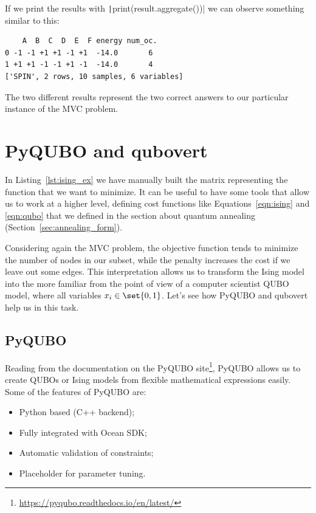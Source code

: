 If we print the results with \texttt|print(result.aggregate())| we can observe something similar to this:
\begin{center}
	\vspace{-.1cm}
	\begin{minipage}{.6\linewidth}
		\begin{verbatim}
	A  B  C  D  E  F energy num_oc.
0 -1 -1 +1 +1 -1 +1  -14.0       6
1 +1 +1 -1 -1 +1 -1  -14.0       4
['SPIN', 2 rows, 10 samples, 6 variables]
		\end{verbatim}
	\end{minipage}
\end{center}
The two different results represent the two correct answers to our particular instance of the MVC problem.

\section{PyQUBO and qubovert}
In Listing~\ref{lst:ising_ex} we have manually built the matrix representing the function that we want to minimize. It can be useful to have some tools that allow us to work at a higher level, defining cost functions like Equations~\ref{eqn:ising} and \ref{eqn:qubo} that we defined in the section about quantum annealing (Section~\ref{sec:annealing_form}).

Considering again the MVC problem, the objective function tends to minimize the number of nodes in our subset, while the penalty increases the cost if we leave out some edges. This interpretation allows us to transform the Ising model into the more familiar \textemdash{}from the point of view of a computer scientist\textemdash{} QUBO model, where all variables $x_i \in \set{0, 1}$. Let's see how PyQUBO and qubovert help us in this task.

\subsection{PyQUBO}
Reading from the documentation on the PyQUBO site\footnote{\url{https://pyqubo.readthedocs.io/en/latest/}}, PyQUBO allows us to create QUBOs or Ising models from flexible mathematical expressions easily. Some of the features of PyQUBO are:
\begin{itemize}
	\item Python based (C++ backend);
	\item Fully integrated with Ocean SDK;
	\item Automatic validation of constraints;
	\item Placeholder for parameter tuning.
\end{itemize}

